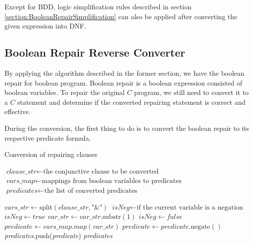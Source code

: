 \documentclass[10pt,journal,final,]{article}
\theoremstyle{definition}
\begin{document}
Except for BDD, logic simplification rules described in section \ref{section:BooleanRepairSimplification} can also be applied after converting the given expression into DNF.

\subsection{Boolean Repair Reverse Converter}
By applying the algorithm described in the former section, we have the boolean repair for boolean program.
Boolean repair is a boolean expression consisted of boolean variables.
To repair the original $C$ program, we still need to convert it to a $C$ statement and determine if the converted repairing statement is correct and effective.


During the conversion, the first thing to do is to convert the boolean repair to its respective predicate formula.

\begin{algorithm}
\caption{Conversion of repairing clauses}
\begin{algorithmic}[1]

\STATE $\textit{clause\_str} \gets \text{the conjunctive clause to be converted}$
\STATE $\textit{vars\_map} \gets \text{mappings from boolean variables to predicates}$
\STATE $\textit{predicates} \gets \text{the list of converted predicates}$
\STATE

\STATE $\textit{vars\_str} \gets \text{split}(\textit{clause\_str}, \text{"\&"})$
  \STATE $\textit{isNeg} \gets \text{if the current variable is a negation}$
    \STATE $\textit{isNeg} \gets true$
    \STATE $\textit{var\_str} \gets \textit{var\_str}.\text{substr}(1)$
  \ELSE
    \STATE $\textit{isNeg} \gets false$
  \ENDIF
  \STATE
  \STATE $\textit{predicate} \gets \textit{vars\_map}.map(\textit{var\_str})$
    \STATE $\textit{predicate} \gets \textit{predicate}.\text{negate}()$
  \ENDIF
  \STATE \textit{predicates}.push(\textit{predicate})
\ENDFOR
\STATE
\RETURN \textit{predicates}

\end{algorithmic}
\end{algorithm}
\end{document}
